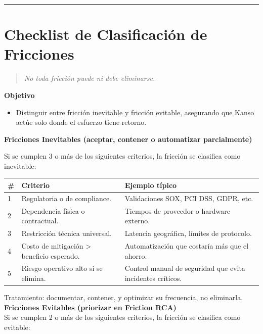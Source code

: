 \hrule
\section{Checklist de Clasificación de Fricciones}
\begin{quote}
\textit{No toda fricción puede ni debe eliminarse.}
\end{quote}

\textbf{Objetivo} 
\begin{itemize}
    \item Distinguir entre fricción inevitable y fricción evitable, asegurando que Kanso actúe solo donde el esfuerzo tiene retorno.
\end{itemize}


\textbf{Fricciones Inevitables (aceptar, contener o automatizar parcialmente)}

Si se cumplen 3 o más de los siguientes criterios, la fricción se clasifica como inevitable:

\begin{center}
\begin{tabular}{|l|p{5cm}|p{6cm}|}
\hline
\# & Criterio & Ejemplo típico \\ \hline
1 & Regulatoria o de compliance. & Validaciones SOX, PCI DSS, GDPR, etc. \\ \hline
2 & Dependencia física o contractual. & Tiempos de proveedor o hardware externo. \\ \hline
3 & Restricción técnica universal. & Latencia geográfica, límites de protocolo. \\ \hline
4 & Costo de mitigación > beneficio esperado. & Automatización que costaría más que el ahorro. \\ \hline
5 & Riesgo operativo alto si se elimina. & Control manual de seguridad que evita incidentes críticos. \\ \hline
\end{tabular}
\end{center}

Tratamiento: documentar, contener, y optimizar su frecuencia, no eliminarla.\\

\textbf{Fricciones Evitables (priorizar en Friction RCA)}\\

Si se cumplen 2 o más de los siguientes criterios, la fricción se clasifica como evitable:

